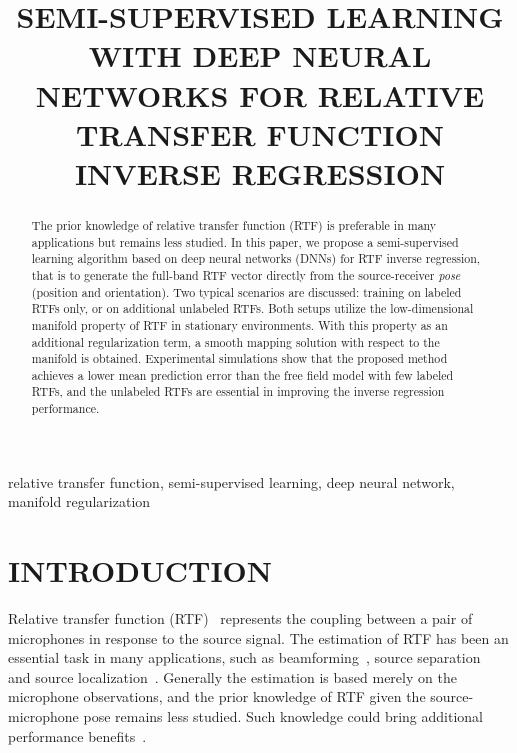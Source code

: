 \documentclass{article}
\title{SEMI-SUPERVISED LEARNING WITH DEEP NEURAL NETWORKS FOR RELATIVE TRANSFER FUNCTION INVERSE REGRESSION }
\begin{document}
\ninept
%
\maketitle
%
\begin{abstract}
The prior knowledge of relative transfer function (RTF) is preferable in many applications but remains less studied. In this paper, we propose a semi-supervised learning algorithm based on deep neural networks (DNNs) for RTF inverse regression, that is to generate the full-band RTF vector directly from the source-receiver \emph{pose} (position and orientation). Two typical scenarios are discussed: training on labeled RTFs only, or on additional unlabeled RTFs. Both setups utilize the low-dimensional manifold property of RTF in stationary environments. With this property as an additional regularization term, a smooth mapping solution with respect to the manifold is obtained. Experimental simulations show that the proposed method achieves a lower mean prediction error than the free field model with few labeled RTFs, and the unlabeled RTFs are essential in improving the inverse regression performance.
\end{abstract}
%
\begin{keywords}
relative transfer function, semi-supervised learning, deep neural network, manifold regularization
\end{keywords}
%
\section{INTRODUCTION}
\label{sec:intro}


Relative transfer function (RTF)~\cite{gannot2001signal,cohen2004relative} represents the coupling between a pair of microphones in response to the source signal. The estimation of RTF has been an essential task in many applications, such as beamforming~\cite{talmon2009relative}, source separation~\cite{taseska2015relative} and  source localization~\cite{li2015estimation}. Generally the estimation is based merely on the microphone observations, and the prior knowledge of RTF given the source-microphone pose remains less studied. Such knowledge could bring additional performance benefits~\cite{talmon2013relative,koldovsky2013semi}.
\end{document}
